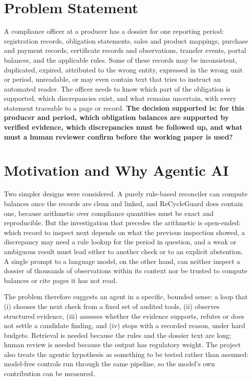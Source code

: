 \section{Problem Statement}
A compliance officer at a producer has a dossier for one reporting period: registration
records, obligation statements, sales and product mappings, purchase and payment records,
certificate records and observations, transfer events, portal balances, and the applicable
rules. Some of these records may be inconsistent, duplicated, expired, attributed to the wrong
entity, expressed in the wrong unit or period, unreadable, or may even contain text that tries to
instruct an automated reader. The officer needs to know which part of the obligation is supported,
which discrepancies exist, and what remains uncertain, with every statement traceable to a page
or record. \textbf{The decision supported is: for this producer and period, which obligation
balances are supported by verified evidence, which discrepancies must be followed up, and what
must a human reviewer confirm before the working paper is used?}

\section{Motivation and Why Agentic AI}
Two simpler designs were considered. A purely rule-based reconciler can compute balances once the
records are clean and linked, and ReCycleGuard does contain one, because arithmetic over
compliance quantities must be exact and reproducible. But the investigation that precedes the
arithmetic is open-ended: which record to inspect next depends on what the previous inspection
showed, a discrepancy may need a rule lookup for the period in question, and a weak or ambiguous
result must lead either to another check or to an explicit abstention. A single prompt to a
language model, on the other hand, can neither inspect a dossier of thousands of observations
within its context nor be trusted to compute balances or cite pages it has not read.

The problem therefore suggests an agent in a specific, bounded sense: a loop that (i) chooses the
next check from a fixed set of audited tools, (ii) observes structured evidence, (iii) assesses
whether the evidence supports, refutes or does not settle a candidate finding, and (iv) stops with a
recorded reason, under hard budgets. Retrieval is needed because the rules and the dossier
text are long; human review is needed because the output has regulatory weight. The project also
treats the agentic hypothesis as something to be tested rather than assumed: model-free controls run
through the same pipeline, so the model's own contribution can be measured.

